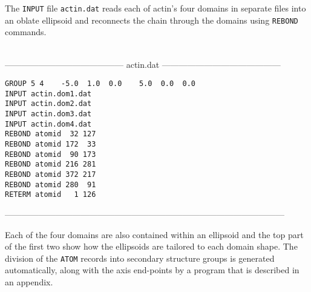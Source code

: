 The {\tt INPUT} file {\tt actin.dat} reads each of actin's four domains in separate files
into an oblate ellipsoid and reconnects the chain through the domains using {\tt REBOND}
commands.

\begin{singlespace}
\ \\
------------------------------------------
actin.dat
------------------------------------------
\begin{verbatim}
GROUP 5 4    -5.0  1.0  0.0    5.0  0.0  0.0
INPUT actin.dom1.dat
INPUT actin.dom2.dat
INPUT actin.dom3.dat
INPUT actin.dom4.dat
REBOND atomid  32 127
REBOND atomid 172  33
REBOND atomid  90 173
REBOND atomid 216 281
REBOND atomid 372 217
REBOND atomid 280  91
RETERM atomid   1 126
\end{verbatim}
---------------------------------------------------------------------------------------------------
\end{singlespace}

Each of the four domains are also contained within an ellipsoid and the top part
of the first two show how the ellipsoids are tailored to each domain shape.
The division of the {\tt ATOM} records into secondary structure groups is generated
automatically, along with the axis end-points by a program that is described in an appendix.

